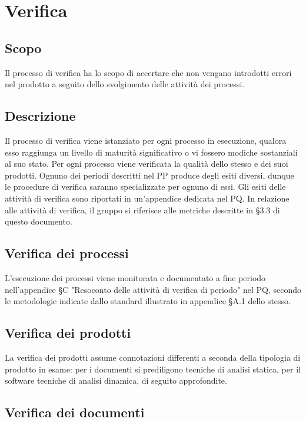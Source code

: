 \documentclass[../NormediProgetto.tex]{subfiles}
\begin{document}
	
	
	
\section{Verifica}

\subsection{Scopo}
Il processo di verifica ha lo scopo di accertare che non vengano introdotti errori nel prodotto a seguito dello svolgimento delle attività dei processi.

\subsection{Descrizione}

Il processo di verifica viene istanziato per ogni processo in esecuzione, qualora esso raggiunga un livello di maturità significativo o vi fossero modiche sostanziali al suo stato. Per ogni processo viene verificata la qualità dello stesso e dei suoi prodotti. Ognuno dei periodi descritti nel PP produce degli esiti diversi, dunque le procedure di verifica saranno specializzate per ognuno di essi. Gli esiti delle attività di
verifica sono riportati in un'appendice dedicata nel PQ. 
In relazione alle attività di verifica, il gruppo si riferisce alle metriche descritte in §3.3 di questo documento.

\subsection{Verifica dei processi} 
L'esecuzione dei processi viene monitorata e documentato a fine periodo nell'appendice §C "Resoconto delle attività di verifica di periodo" nel PQ, secondo le metodologie indicate dallo standard  illustrato in appendice §A.1 dello stesso.

\subsection{Verifica dei prodotti}
La verifica dei prodotti assume connotazioni differenti a seconda della tipologia di prodotto in esame: per i documenti si prediligono tecniche di analisi statica, per il software tecniche di analisi dinamica, di seguito approfondite.

\subsection{Verifica dei documenti}
\end{document}
